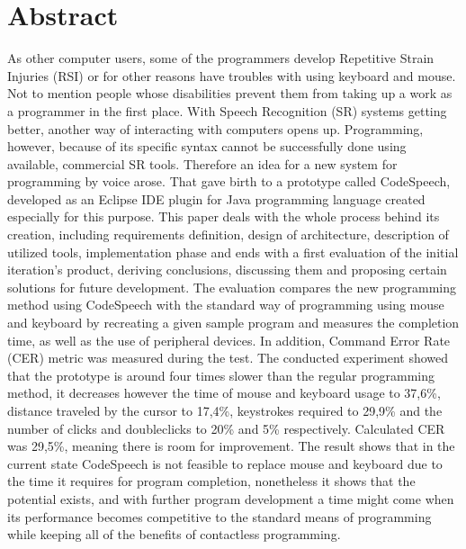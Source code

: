 \chapter{Abstract}

As other computer users, some of the programmers develop Repetitive
Strain Injuries (RSI) or for other reasons have troubles with
using keyboard and mouse. Not to mention people whose disabilities
prevent them from taking up a work as a programmer in the first
place. With Speech Recognition (SR) systems getting better, another
way of interacting with computers opens up. Programming,
however, because of its specific syntax cannot be successfully
done using available, commercial SR tools. Therefore an idea for a new system for programming by voice arose. That gave birth to a prototype called CodeSpeech, developed as an Eclipse IDE plugin for Java programming language created especially for this purpose. This paper deals with the whole process behind its creation, including requirements definition, design of architecture, description of utilized tools, implementation phase and ends with a first evaluation of the initial iteration's product, deriving conclusions, discussing them and proposing certain solutions for future development. The evaluation compares the new programming method using CodeSpeech with the standard way of programming using mouse and keyboard by recreating a
given sample program and measures the completion time, as well as the use of peripheral devices. In addition, Command Error Rate (CER) metric was measured during the test. The conducted experiment showed that the prototype is around four times slower than the regular programming method, it decreases however the time of mouse and keyboard usage to 37,6\%, distance traveled by the cursor to 17,4\%, keystrokes required to 29,9\% and the number of clicks and doubleclicks to 20\% and 5\% respectively. Calculated CER was 29,5\%, meaning there is room for improvement. The result shows that in the current state CodeSpeech is not feasible to replace mouse and keyboard due to the time it requires for program completion, nonetheless it shows that the potential exists, and with further program development a time might come when its performance becomes competitive to the standard means of programming while keeping all of the benefits of contactless programming.


